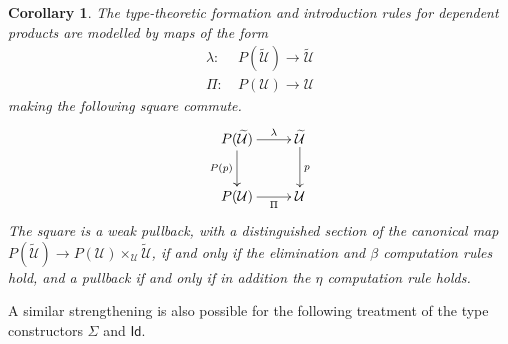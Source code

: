 \documentclass[12pt]{article}
\newcommand{\Id}{\mathsf{Id}}
\newcommand{\U}{\ensuremath{\mathcal{U}}}
\newcommand{\UU}{\ensuremath{\widetilde{\mathcal{U}}}}
\newtheorem{corollary}[theorem]{Corollary}
\theoremstyle{definition}
\begin{document}
\begin{corollary}
The type-theoretic formation and introduction rules for dependent products are modelled by maps of the form
\begin{align}
\lambda :&\ P(\UU)\to \UU \label{prop:prod1}\\
\Pi :&\ P(\U) \to \U \label{prop:prod2}
\end{align}
making the following square commute. 
%
\begin{equation}\label{diag:prod}
\xymatrix{
P(\UU)  \ar[d]_{P(p)} \ar[r]^-{\lambda} &  \UU \ar[d]^{p}\\
P(\U) \ar[r]_-{\Pi} & \U }
\end{equation}
%
The square is a weak pullback, with a distinguished section of the canonical map $P(\UU) \to P(\U) \times_{\U}\UU$, if and only if the elimination and $\beta$ computation rules hold, and a pullback if and only if in addition the $\eta$ computation rule holds.
\end{corollary}
A similar strengthening is also possible for the following treatment of the type constructors $\Sigma$ and $\Id$.
\end{document}

